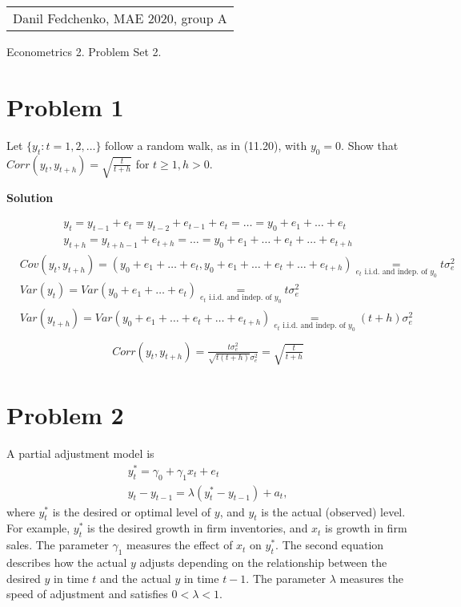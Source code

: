 \documentclass[a4paper]{article}
\begin{document}
	\begin{flushright}
	\begin{tabular}{r}
		Danil Fedchenko, MAE 2020, group A \\
	\end{tabular}
\end{flushright}


\begin{center}
	Econometrics 2. Problem Set 2.
\end{center}
\section*{Problem 1}
Let $\{y_t: t = 1, 2,\dots\}$ follow a random walk, as in (11.20), with $y_0 = 0$. Show that $Corr(y_t, y_{t+h}) =\sqrt{\frac{t}{t + h}}$   for $t \ge 1, h > 0$.

\textbf{Solution}

\begin{align*}
y_t = y_{t-1} + e_t = y_{t-2} + e_{t-1} + e_t = \dots = y_0 + e_1 + \dots + e_t\\
y_{t+h} = y_{t+h-1} + e_{t+h} = \dots = y_0 + e_1 + \dots + e_{t} + \dots + e_{t+h}
\end{align*}
\begin{align*}
&Cov(y_t, y_{t+h}) = (y_0 + e_1 + \dots + e_t, y_0 + e_1 + \dots + e_{t} + \dots + e_{t+h}) \underset{e_t \text{ i.i.d. and indep. of }y_0}{=} t\sigma^2_e\\
&Var(y_t) = Var(y_0 + e_1 + \dots + e_t)\underset{e_t \text{ i.i.d. and indep. of }y_0}{=} t\sigma^2_e\\
&Var(y_{t+h}) = Var(y_0 + e_1 + \dots + e_{t} + \dots + e_{t+h}) \underset{e_t \text{ i.i.d. and indep. of }y_0}{=} (t+h) \sigma^2_e\\
\end{align*}
\begin{align*}
Corr(y_t, y_{t+h}) = \frac{t\sigma^2_e}{\sqrt{t(t+h)}\sigma^2_e} = \sqrt{\frac{t}{t+h}}
\end{align*}
\section*{Problem 2}
A partial adjustment model is
\begin{align*}
y_t^* = \gamma_0 + \gamma_1 x_t + e_t\\
y_t - y_{t-1} = \lambda(y_t^* - y_{t-1}) + a_t, 
\end{align*}
where $y_t^*$ is the desired or optimal level of $y$, and $y_t$ is the actual (observed) level. For example, $y_t^*$ is the desired growth in firm inventories, and $x_t$ is growth in firm sales. The parameter $\gamma_1$ measures the effect of $x_t$ on $y_t^*$. The second equation describes how the actual $y$ adjusts depending on the relationship between the desired $y$ in time $t$ and the actual $y$ in time $t-1$. The parameter $\lambda$ measures the speed of adjustment and satisfies $0 < \lambda <1$.
\end{document}

